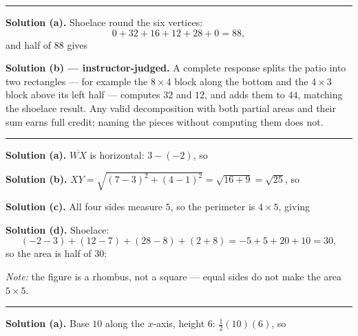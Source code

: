 \documentclass[12pt]{article}
\begin{document}
\vspace{0.15cm}\noindent\rule{\linewidth}{0.2pt}


\noindent\textbf{Solution (a).} Shoelace round the six vertices:
\[ 0 + 32 + 16 + 12 + 28 + 0 = 88 , \]
and half of $88$ gives 

\noindent\textbf{Solution (b) --- instructor-judged.} A complete response splits
the patio into two rectangles --- for example the $8 \times 4$ block along the
bottom and the $4 \times 3$ block above its left half --- computes $32$ and $12$,
and adds them to $44$, matching the shoelace result. Any valid decomposition with
both partial areas and their sum earns full credit; naming the pieces without
computing them does not.

\vspace{0.15cm}\noindent\rule{\linewidth}{0.2pt}


\noindent\textbf{Solution (a).} $\overline{WX}$ is horizontal:
$3 - (-2)$, so 

\noindent\textbf{Solution (b).} $XY = \sqrt{(7-3)^2 + (4-1)^2} = \sqrt{16+9}
= \sqrt{25}$, so 

\noindent\textbf{Solution (c).} All four sides measure $5$, so the perimeter is
$4 \times 5$, giving 

\noindent\textbf{Solution (d).} Shoelace:
\[ (-2 - 3) + (12 - 7) + (28 - 8) + (2 + 8) = -5 + 5 + 20 + 10 = 30 , \]
so the area is half of $30$: 

\noindent\textit{Note:} the figure is a rhombus, not a square --- equal sides do
not make the area $5 \times 5$.

\vspace{0.15cm}\noindent\rule{\linewidth}{0.2pt}


\noindent\textbf{Solution (a).} Base $10$ along the $x$-axis, height $6$:
$\tfrac{1}{2}(10)(6)$, so 
\end{document}

